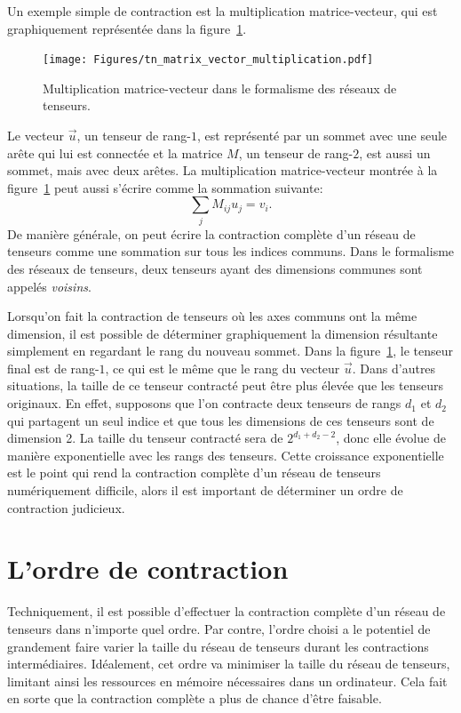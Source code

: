 Un exemple simple de contraction est la multiplication matrice-vecteur, qui est graphiquement représentée dans la figure~\ref{fig:tn_mat-vec_multiplication}.
\begin{figure}[h]
    \centering
    \texttt{[image: Figures/tn\_matrix\_vector\_multiplication.pdf]}
    \caption{Multiplication matrice-vecteur dans le formalisme des réseaux de tenseurs.}
    \label{fig:tn_mat-vec_multiplication}
\end{figure}
Le vecteur $\vec{u}$, un tenseur de rang-$1$, est représenté par un sommet avec une seule arête qui lui est connectée et la matrice $M$, un tenseur de rang-$2$, est aussi un sommet, mais avec deux arêtes.
La multiplication matrice-vecteur montrée à la figure~\ref{fig:tn_mat-vec_multiplication} peut aussi s'écrire comme la sommation suivante:
\begin{equation}\label{eq:einsum}
    \sum_j M_{ij}u_j = v_i.
\end{equation}
De manière générale, on peut écrire la contraction complète d'un réseau de tenseurs comme une sommation sur tous les indices communs.
Dans le formalisme des réseaux de tenseurs, deux tenseurs ayant des dimensions communes sont appelés \emph{voisins}.

Lorsqu'on fait la contraction de tenseurs où les axes communs ont la même dimension, il est possible de déterminer graphiquement la dimension résultante simplement en regardant le rang du nouveau sommet.
Dans la figure~\ref{fig:tn_mat-vec_multiplication}, le tenseur final est de rang-$1$, ce qui est le même que le rang du vecteur $\vec{u}$.
Dans d'autres situations, la taille de ce tenseur contracté peut être plus élevée que les tenseurs originaux.
En effet, supposons que l'on contracte deux tenseurs de rangs $d_1$ et $d_2$ qui partagent un seul indice et que tous les dimensions de ces tenseurs sont de dimension 2.
La taille du tenseur contracté sera de $2^{d_1 + d_2 - 2}$, donc elle évolue de manière exponentielle avec les rangs des tenseurs.
Cette croissance exponentielle est le point qui rend la contraction complète d'un réseau de tenseurs numériquement difficile, alors il est important de déterminer un ordre de contraction judicieux.


\section{L'ordre de contraction}\label{sec:contraction-ordering}
Techniquement, il est possible d'effectuer la contraction complète d'un réseau de tenseurs dans n'importe quel ordre.
Par contre, l'ordre choisi a le potentiel de grandement faire varier la taille du réseau de tenseurs durant les contractions intermédiaires.
Idéalement, cet ordre va minimiser la taille du réseau de tenseurs, limitant ainsi les ressources en mémoire nécessaires dans un ordinateur.
Cela fait en sorte que la contraction complète a plus de chance d'être faisable.

